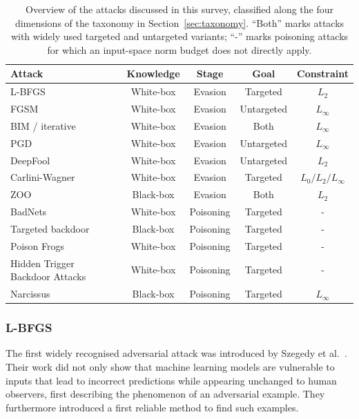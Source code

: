 \documentclass[review]{AIM_report}
\begin{document}
\begin{table}[t]
\centering
\caption{Overview of the attacks discussed in this survey, classified along the four dimensions of the taxonomy in Section~\ref{sec:taxonomy}. ``Both'' marks attacks with widely used targeted and untargeted variants; ``-'' marks poisoning attacks for which an input-space norm budget does not directly apply.}
\label{table_with_all_attacks}
\small
\begin{tabular}{@{}lcccc@{}}
\toprule
Attack & Knowledge & Stage & Goal & Constraint \\
\midrule
L-BFGS~\cite{szegedy2013intriguing}                     & White-box & Evasion   & Targeted   & $L_2$ \\
FGSM~\cite{goodfellow2014explaining}                    & White-box & Evasion   & Untargeted & $L_\infty$ \\
BIM / iterative~\cite{kurakin2017physical}              & White-box & Evasion   & Both       & $L_\infty$ \\
PGD~\cite{madry2017towards}                             & White-box & Evasion   & Untargeted & $L_\infty$ \\
DeepFool~\cite{moosavi2016deepfool}                     & White-box & Evasion   & Untargeted & $L_2$ \\
Carlini-Wagner~\cite{carlini2017towards}               & White-box & Evasion   & Targeted   & $L_0/L_2/L_\infty$ \\
ZOO~\cite{chen2017zoo}                                  & Black-box & Evasion   & Both       & $L_2$ \\
BadNets~\cite{gu2017badnets}                            & White-box & Poisoning & Targeted   & - \\
Targeted backdoor~\cite{chen2017targeted}               & Black-box & Poisoning & Targeted   & - \\
Poison Frogs~\cite{shafahi2018poison}                   & White-box & Poisoning & Targeted   & - \\
Hidden Trigger Backdoor Attacks~\cite{saha2020hidden} & White-box & Poisoning & Targeted & - \\
Narcissus~\cite{zeng2023narcissus}                      & Black-box & Poisoning & Targeted   & $L_\infty$ \\
\bottomrule
\end{tabular}
\end{table}

\subsubsection{L-BFGS}
The first widely recognised adversarial attack was introduced by Szegedy et al.~\cite{szegedy2013intriguing}. Their work did not only show that machine learning models are vulnerable to inputs that lead to incorrect predictions while appearing unchanged to human observers, first describing the phenomenon of an adversarial example. They furthermore introduced a first reliable method to find such examples.
\end{document}

